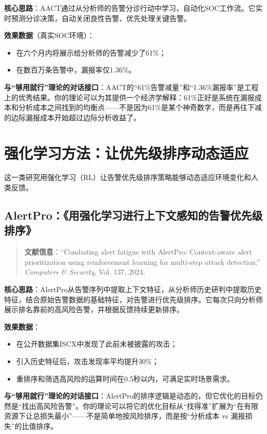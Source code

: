 \documentclass[11pt,a4paper]{article}
\begin{document}
\textbf{核心思路}：AACT通过从分析师的告警分诊行动中学习，自动化SOC工作流。它实时预测分诊决策，自动关闭良性告警、优先处理关键告警。

\textbf{效果数据}（真实SOC环境）：
\begin{itemize}
    \item 在六个月内将展示给分析师的告警减少了61\%；
    \item 在数百万条告警中，漏报率仅1.36\%。
\end{itemize}

\textbf{与“够用就行”理论的对话接口}：AACT的“61\%告警减量”和“1.36\%漏报率”是工程上的优秀结果。你的理论可以为其提供一个经济学解释：61\%正好是系统在漏报成本和分析成本之间找到的均衡点——不是因为61\%是某个神奇数字，而是再往下减的边际漏报成本开始超过边际分析收益了。

\section{强化学习方法：让优先级排序动态适应}

这一类研究用强化学习（RL）让告警优先级排序策略能够动态适应环境变化和人类反馈。

\subsection{AlertPro：《用强化学习进行上下文感知的告警优先级排序》}

\begin{quote}
\textbf{文献信息}：“Combating alert fatigue with AlertPro: Context-aware alert prioritization using reinforcement learning for multi-step attack detection.” \textit{Computers \& Security}, Vol. 137, 2024.
\end{quote}

\textbf{核心思路}：AlertPro从告警序列中提取上下文特征，从分析师历史研判中提取历史特征，结合原始告警数据的基础特征，对告警进行优先级排序。它每次只向分析师展示排名靠前的高风险告警，并根据反馈持续更新排序。

\textbf{效果数据}：
\begin{itemize}
    \item 在公开数据集ISCX中发现了此前未被披露的攻击；
    \item 引入历史特征后，攻击发现率平均提升30\%；
    \item 重排序和筛选高风险的运算时间在0.5秒以内，可满足实时场景需求。
\end{itemize}

\textbf{与“够用就行”理论的对话接口}：AlertPro的排序逻辑是动态的，但它优化的目标仍然是“找出高风险告警”。你的理论可以将它的优化目标从“找得准”扩展为“在有限资源下让总损失最小”——不是简单地按风险排序，而是按“分析成本 vs 漏报损失”的比值排序。
\end{document}
